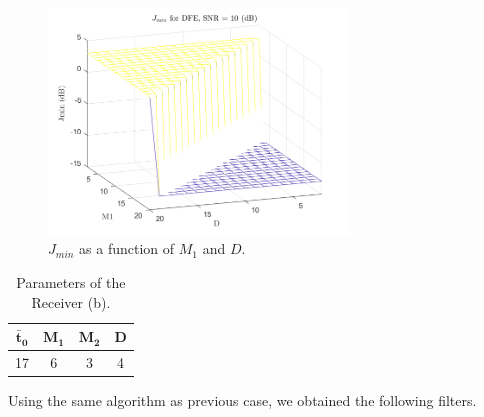 \documentclass[a4paper, 12pt]{report}
\begin{document}
\begin{figure}[H]
	\centering
	\includegraphics[width=8cm]{images/optimal_params_DFE}
	\caption{$J_{min}$ as a function of $M_1$ and $D$.}\label{j_min_dfe}
\end{figure}

\begin{table}[H]
	\centering
	\begin{tabular}{c c c c}
		\toprule
		$\mathbf{\bar{t}_0}$ & $\mathbf{M_1}$ & $\mathbf{M_2}$ & \textbf{D}     \\
		\midrule
		17 & 6 & 3 & 4 \\
		\bottomrule			
	\end{tabular}
	\caption{Parameters of the Receiver (b).}
	\label{Tab_b}
\end{table}

Using the same algorithm as previous case, we obtained the following filters.
\end{document}
